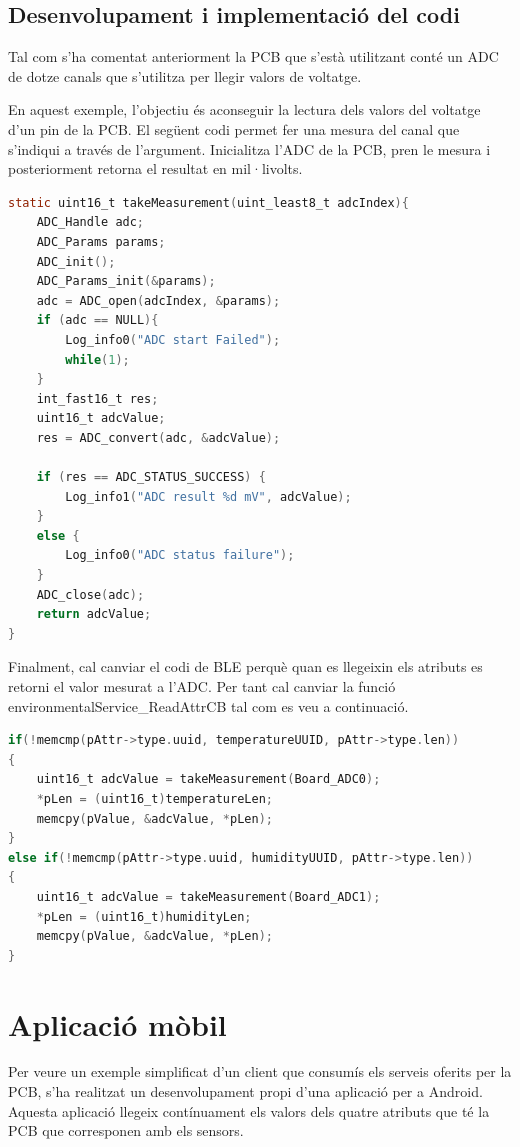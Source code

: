 \subsection{Desenvolupament i implementació del codi}

Tal com s'ha comentat anteriorment la PCB que s'està utilitzant conté un ADC de dotze canals que s'utilitza per llegir valors de voltatge.

En aquest exemple, l'objectiu és aconseguir la lectura dels valors del voltatge d'un pin de la PCB.
El següent codi permet fer una mesura del canal que s'indiqui a través de l'argument.
Inicialitza l'ADC de la PCB, pren le mesura i posteriorment retorna el resultat en mil·livolts.

\begin{lstlisting}[language=C]
static uint16_t takeMeasurement(uint_least8_t adcIndex){
	ADC_Handle adc;
	ADC_Params params;
	ADC_init();
	ADC_Params_init(&params);
	adc = ADC_open(adcIndex, &params);
	if (adc == NULL){
		Log_info0("ADC start Failed");
		while(1);
	}
	int_fast16_t res;
	uint16_t adcValue;
	res = ADC_convert(adc, &adcValue);
	
	if (res == ADC_STATUS_SUCCESS) {
		Log_info1("ADC result %d mV", adcValue);
	}
	else {
		Log_info0("ADC status failure");
	}
	ADC_close(adc);
	return adcValue;
}
\end{lstlisting}

Finalment, cal canviar el codi de BLE perquè quan es llegeixin els atributs es retorni el valor mesurat a l'ADC.
Per tant cal canviar la funció environmentalService\_ReadAttrCB tal com es veu a continuació.

\begin{lstlisting}[language=C]
  if(!memcmp(pAttr->type.uuid, temperatureUUID, pAttr->type.len))
{
	uint16_t adcValue = takeMeasurement(Board_ADC0);
	*pLen = (uint16_t)temperatureLen;
	memcpy(pValue, &adcValue, *pLen);
}
else if(!memcmp(pAttr->type.uuid, humidityUUID, pAttr->type.len))
{
	uint16_t adcValue = takeMeasurement(Board_ADC1);
	*pLen = (uint16_t)humidityLen;
	memcpy(pValue, &adcValue, *pLen);
}
\end{lstlisting}


\section{Aplicació mòbil}
Per veure un exemple simplificat d'un client que consumís els serveis oferits per la PCB, s'ha realitzat un desenvolupament propi d'una aplicació per a Android.
Aquesta aplicació llegeix contínuament els valors dels quatre atributs que té la PCB que corresponen amb els sensors.

